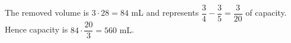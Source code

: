 The removed volume is $3\cdot28=84$ mL and represents $\dfrac{3}{4}-\dfrac{3}{5}=\dfrac{3}{20}$ of capacity. Hence capacity is $84\cdot\dfrac{20}{3}=\boxed{560\text{ mL}}$.
